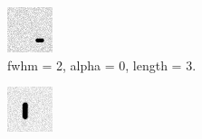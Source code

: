 \begin{figure}[!h]
\centering
    \begin{subfigure}{.23\textwidth}
        \centering
        \includegraphics[width=\textwidth]{images/streakA.png}
        \caption{fwhm = 2, alpha = 0, length = 3.}
        \label{fig:streakA}
    \end{subfigure}
    \begin{subfigure}{.23\textwidth}
        \centering
        \includegraphics[width=\textwidth]{images/streakB.png}

\end{subfigure}
\end{figure}
